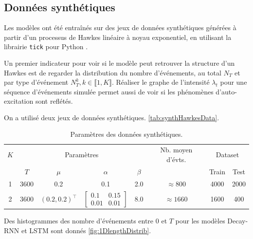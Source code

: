 \documentclass[../main.tex]{subfiles}
\begin{document}
\subsection{Données synthétiques}\label{ssec:synthResults}

Les modèles ont été entraînés sur des jeux de données synthétiques générées à partir d'un processus de Hawkes linéaire à noyau exponentiel, en utilisant la librairie \verb|tick| pour Python \cite{2017arXiv170703003B}.

Un premier indicateur pour voir si le modèle peut retrouver la structure d'un Hawkes est de regarder la distribution du nombre d'événements, au total $N_T$ et par type d'événement $N^k_T, k\in\llbracket 1,K\rrbracket$. Réaliser le graphe de l'intensité $\lambda_t$ pour une séquence d'événements simulée permet aussi de voir si les phénomènes d'auto-excitation sont reflétés.

On a utilisé deux jeux de données synthétiques. \autoref{tab:synthHawkesData}.

\begin{table}[h]
	\centering
	\begin{tabular}{@{}cccccccc}
		\toprule
		$K$ & \multicolumn{4}{c}{Paramètres} & Nb. moyen d'évts. & \multicolumn{2}{c}{Dataset} \\ \cmidrule(r){2-5}\cmidrule(r){7-8}
		    & $T$ & $\mu$ & $\alpha$ & $\beta$ & & Train & Test\\ \midrule
		1 & 3600 & 0.2 & 0.1 & 2.0 & $\approx 800$ & 4000 & 2000 \\ \midrule
		2 & 3600 & $(0.2, 0.2)^\intercal$ & $\begin{bmatrix}0.1 & 0.15\\0.01&0.01\end{bmatrix}$ & 8.0 & $\approx 1660$ & 1600 & 400\\
		\bottomrule
	\end{tabular}
	\caption{Paramètres des données synthétiques.}\label{tab:synthHawkesData}
\end{table}

Des histogrammes des nombre d'événements entre $0$ et $T$ pour les modèles Decay-RNN et LSTM sont donnés \autoref{fig:1DlengthDistrib}.
\end{document}
